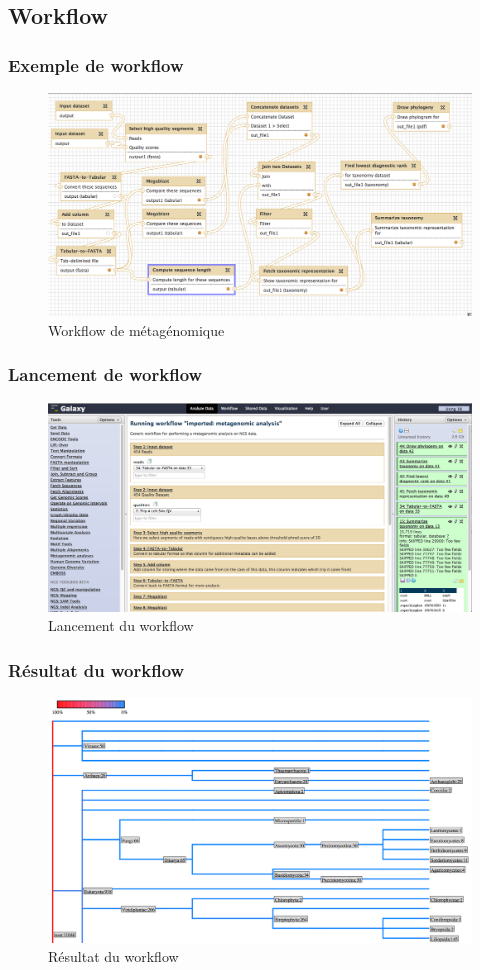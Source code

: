 \documentclass[12pt]{beamer}
\begin{document}
\subsection{Workflow}
\begin{frame}
\frametitle{Exemple de workflow}
\begin{figure}
   \begin{center}
 \includegraphics[scale=0.23]{img/workflow1.png}
 	\caption{Workflow de métagénomique}
   \end{center}
  \end{figure}
\end{frame}

\begin{frame}
\frametitle{Lancement de workflow}
\begin{figure}
   \begin{center}
 \includegraphics[scale=0.2]{img/preRun.png}
 	\caption{Lancement du workflow}
   \end{center}
  \end{figure}
\end{frame}

\begin{frame}
\frametitle{Résultat du workflow}
\begin{figure}
   \begin{center}
 \includegraphics[scale=0.2]{img/resultat.png}
 	\caption{Résultat du workflow}
   \end{center}
  \end{figure}
\end{frame}
\end{document}
